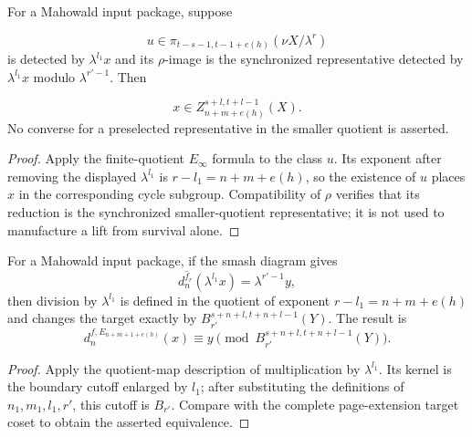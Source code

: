 \begin{lemma}
  \label{lem:mahowald-quotient-lift-survival}
  \notready
  For a Mahowald input package, suppose

  \[
    u\in\pi_{t-s-1,t-1+e(h)}(\nu X/\lambda^r)
  \]
  is detected by $\lambda^{l_1}x$ and its $\rho$-image is the synchronized
  representative detected by $\lambda^{l_1}x$ modulo $\lambda^{r'-1}$.
  Then

  \[
    x\in Z_{n+m+e(h)}^{s+l,t+l-1}(X).
  \]
  No converse for a preselected representative in the smaller quotient is
  asserted.
\end{lemma}

\begin{proof}
  Apply the finite-quotient $E_\infty$ formula to the class $u$.  Its exponent
  after removing the displayed $\lambda^{l_1}$ is
  $r-l_1=n+m+e(h)$, so the existence of $u$ places $x$ in the corresponding
  cycle subgroup.  Compatibility of $\rho$ verifies that its reduction is the
  synchronized smaller-quotient representative; it is not used to manufacture
  a lift from survival alone.
\end{proof}

\begin{lemma}
  \label{lem:mahowald-lambda-division}
  \notready
  For a Mahowald input package, if the smash diagram gives
  \[
    d_n^{\widehat f_r}(\lambda^{l_1}x)=\lambda^{r'-1}y,
  \]
  then division by $\lambda^{l_1}$ is defined in the quotient of exponent
  $r-l_1=n+m+e(h)$ and changes the target exactly by
  $B_{r'}^{s+n+l,t+n+l-1}(Y)$.  The result is
  \[
    d_n^{f,E_{n+m+1+e(h)}}(x)
       \equiv y\pmod{B_{r'}^{s+n+l,t+n+l-1}(Y)}.
  \]
\end{lemma}

\begin{proof}
  Apply the quotient-map description of multiplication by $\lambda^{l_1}$.
  Its kernel is the boundary cutoff enlarged by $l_1$; after substituting the
  definitions of $n_1,m_1,l_1,r'$, this cutoff is $B_{r'}$.  Compare with the
  complete page-extension target coset to obtain the asserted equivalence.
\end{proof}

